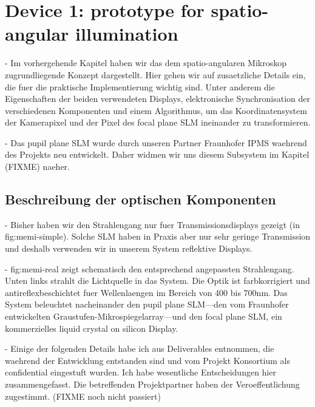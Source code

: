 \chapter{Device 1: prototype for spatio-angular illumination}
\begin{summary}
   - Im vorhergehende Kapitel haben wir das dem spatio-angularen
     Mikroskop zugrundliegende Konzept dargestellt. Hier gehen wir auf
     zusaetzliche Details ein, die fuer die praktische Implementierung
     wichtig sind. Unter anderem die Eigenschaften der beiden
     verwendeten Displays, elektronische Synchronisation der
     verschiedenen Komponenten und einem Algorithmus, um das             %
     Koordinatensystem der Kamerapixel und der Pixel des focal plane
     SLM ineinander zu transformieren.

   - Das pupil plane SLM wurde durch unseren Partner Fraunhofer IPMS
     waehrend des Projekts neu entwickelt.  Daher widmen wir uns diesem   %
     Subsystem im Kapitel (FIXME) naeher.
\end{summary}
\section{Beschreibung der optischen Komponenten}
 - Bisher haben wir den Strahlengang nur fuer Transmissionsdisplays
   gezeigt (in fig:memi-simple). Solche SLM haben in Praxis aber nur     %
   sehr geringe Transmission und deshalb verwenden wir in unserem
   System reflektive Displays.

 - fig:memi-real zeigt schematisch den entsprechend angepassten
   Strahlengang.  Unten links strahlt die Lichtquelle in das
   System. Die Optik ist farbkorrigiert und antireflexbeschichtet 
   fuer Wellenlaengen im Bereich
   von 400 bis 700nm.  Das System beleuchtet nacheinander den pupil     %
   plane SLM---den vom Fraunhofer entwickelten
   Graustufen-Mikrospiegelarray---und den focal plane SLM, ein
   kommerzielles liquid crystal on silicon Display.
 
 - Einige der folgenden Details habe ich aus Deliverables entnommen,
   die waehrend der Entwicklung entstanden sind und vom Projekt
   Konsortium als confidential eingestuft wurden. Ich habe wesentliche  %
   Entscheidungen hier zusammengefasst. Die betreffenden
   Projektpartner haben der Veroeffentlichung zugestimmt. (FIXME noch
   nicht passiert)
  


